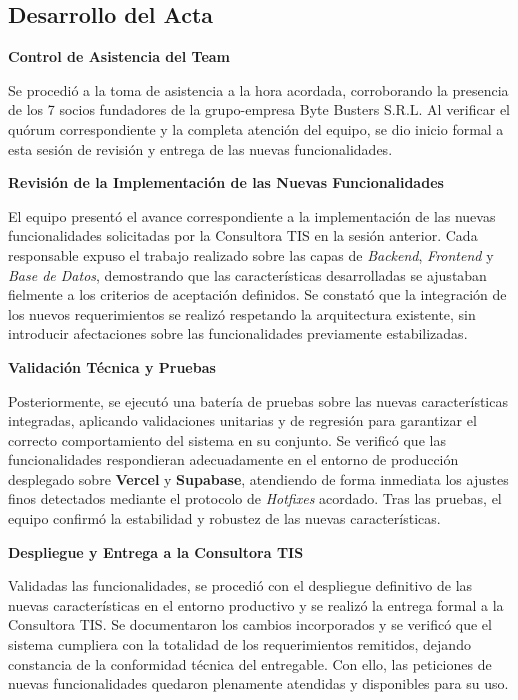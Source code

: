 \newpage
\subsection{Desarrollo del Acta}

\noindent \textbf{Control de Asistencia del Team}\par
Se procedió a la toma de asistencia a la hora acordada, corroborando la presencia de los 7 socios fundadores de la grupo-empresa Byte Busters S.R.L. Al verificar el quórum correspondiente y la completa atención del equipo, se dio inicio formal a esta sesión de revisión y entrega de las nuevas funcionalidades.

\vspace*{0.5cm}
\noindent \textbf{Revisión de la Implementación de las Nuevas Funcionalidades}\par
El equipo presentó el avance correspondiente a la implementación de las nuevas funcionalidades solicitadas por la Consultora TIS en la sesión anterior. Cada responsable expuso el trabajo realizado sobre las capas de \textit{Backend}, \textit{Frontend} y \textit{Base de Datos}, demostrando que las características desarrolladas se ajustaban fielmente a los criterios de aceptación definidos. Se constató que la integración de los nuevos requerimientos se realizó respetando la arquitectura existente, sin introducir afectaciones sobre las funcionalidades previamente estabilizadas.

\vspace*{0.5cm}
\noindent \textbf{Validación Técnica y Pruebas}\par
Posteriormente, se ejecutó una batería de pruebas sobre las nuevas características integradas, aplicando validaciones unitarias y de regresión para garantizar el correcto comportamiento del sistema en su conjunto. Se verificó que las funcionalidades respondieran adecuadamente en el entorno de producción desplegado sobre \textbf{Vercel} y \textbf{Supabase}, atendiendo de forma inmediata los ajustes finos detectados mediante el protocolo de \textit{Hotfixes} acordado. Tras las pruebas, el equipo confirmó la estabilidad y robustez de las nuevas características.

\vspace*{0.5cm}
\noindent \textbf{Despliegue y Entrega a la Consultora TIS}\par
Validadas las funcionalidades, se procedió con el despliegue definitivo de las nuevas características en el entorno productivo y se realizó la entrega formal a la Consultora TIS. Se documentaron los cambios incorporados y se verificó que el sistema cumpliera con la totalidad de los requerimientos remitidos, dejando constancia de la conformidad técnica del entregable. Con ello, las peticiones de nuevas funcionalidades quedaron plenamente atendidas y disponibles para su uso.

